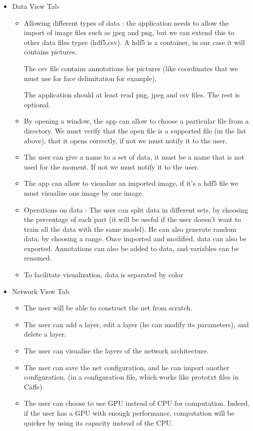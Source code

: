 \begin{itemize}
   \item Data View Tab
   \begin{itemize}
     \item Allowing different types of data : the application needs to allow the import of image files such as jpeg and png, but we can extend this to other data files types (hdf5,csv).
     A hdf5 is a container, in our case it will contains pictures.
     
     The csv file contains annotations for pictures (like coordinates that we must use for face delimitation for example).
     
     The application should at least read png, jpeg and csv files. The rest is optional.
     
     \item  By opening a window, the app can allow to choose a particular file from a directory. We must verify that the open file is a supported file (in the list above), that it opens correctly, if not we must notify it to the user.
     \item The user can give a name to a set of data, it must be a name that is not used for the moment. If not we must notify it to the user.
     \item The app can allow to visualize an imported image, if it's a hdf5 file we must visualize one image by one image.
     \item Operations on data : The user can split data in different sets, by choosing the percentage of each part (it will be useful if the user doesn't want to train all the data with the same model). He can also generate random data, by choosing a range. Once imported and modified, data can also be exported. Annotations can also be added to data, and variables can be renamed.
     \item To facilitate visualization, data is separated by color
   \end{itemize}
   \pagebreak
   \item Network View Tab
   \begin{itemize}
         \item The user will be able to construct the net from scratch.
         \item The user can add a layer, edit a layer (he can modify its parameters), and delete a layer.
         \item The user can visualise the layers of the network architecture.
         \item The user can save the net configuration, and he can import another configuration. (in a configuration file, which works like prototxt files in Caffe)
         \item The user can choose to use GPU instead of CPU for computation. Indeed, if the user has a GPU with enough performance, computation will be quicker by using its capacity instead of the CPU.
     

\end{itemize}
\end{itemize}
